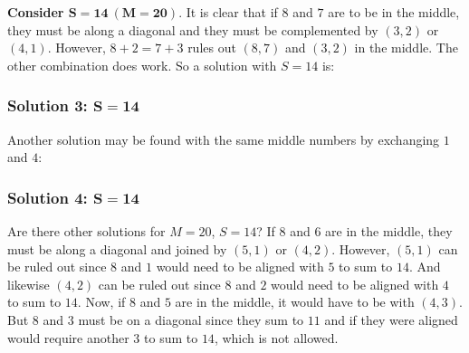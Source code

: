 \documentclass[12pt]{article}
\begin{document}
\textbf{Consider $\mathbf{S=14~(M=20)}$}. It is clear that if $8$ and $7$ are to be in the middle, they must be along a diagonal and they must be complemented by $(3,2)$ or $(4,1)$. However, $8+2=7+3$ rules out $(8,7)$ and $(3,2)$ in the middle. The other combination does work. So a solution with $S=14$ is:
\begin{center}
\subsubsection*{Solution 3: $\mathbf{S=14}$}
\end{center}

Another solution may be found with the same middle numbers by exchanging $1$ and $4$:
\begin{center}
\subsubsection*{Solution 4: $\mathbf{S=14}$}
\end{center}

Are there other solutions for $M=20$, $S=14$? If $8$ and $6$ are in the middle, they must be along a diagonal and joined by $(5,1)$ or $(4,2)$. However, $(5,1)$ can be ruled out since $8$ and $1$ would need to be aligned with $5$ to sum to $14$. And likewise $(4,2)$ can be ruled out since $8$ and $2$ would need to be aligned with $4$ to sum to $14$. Now, if $8$ and $5$ are in the middle, it would have to be with $(4,3)$. But $8$ and $3$ must be on a diagonal since they sum to $11$ and if they were aligned would require another $3$ to sum to $14$, which is not allowed. 
\end{document}
